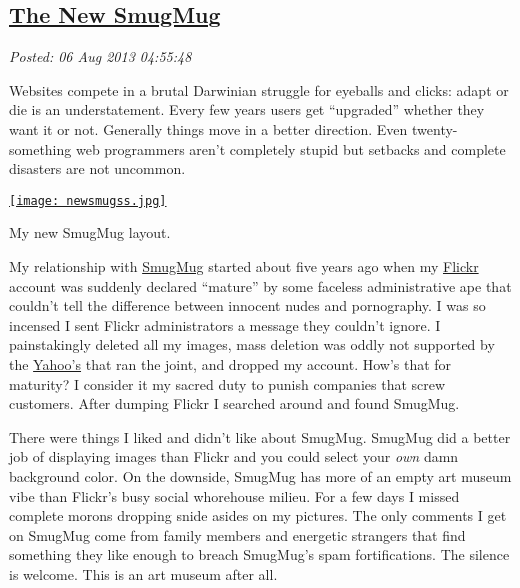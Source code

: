 %

\subsection*{\href{http://bakerjd99.wordpress.com/2013/08/05/the-new-smugmug/}{The New SmugMug}}


\noindent\emph{Posted: 06 Aug 2013 04:55:48}
\vspace{6pt}

Websites compete in a brutal Darwinian struggle for eyeballs and clicks:
adapt or die is an understatement. Every few years users get
``upgraded'' whether they want it or not. Generally things move in a
better direction. Even twenty-something web programmers aren't
completely stupid but setbacks and complete disasters are not uncommon.



\captionsetup[figure]{labelformat=empty}
\captionsetup[floatingfigure]{labelformat=empty}

\begin{floatingfigure}[r]{0.37\textwidth}
\centering
\href{http://conceptcontrol.smugmug.com/}{\texttt{[image: newsmugss.jpg]}}
\caption{My new SmugMug layout.}
\label{fig:4126X0}
\end{floatingfigure}


My relationship with \href{http://www.smugmug.com/}{SmugMug} started
about five years ago when my \href{http://www.flickr.com/}{Flickr}
account was suddenly declared ``mature'' by some faceless administrative
ape that couldn't tell the difference between innocent nudes and
pornography. I was so incensed I sent Flickr administrators a message
they couldn't ignore. I painstakingly deleted all my images, mass
deletion was oddly not supported by the
\href{http://www.yahoo.com/}{Yahoo's} that ran the joint, and dropped my
account. How's that for maturity? I consider it my sacred duty to punish
companies that screw customers. After dumping Flickr I searched around
and found SmugMug.

There were things I liked and didn't like about SmugMug. SmugMug did a
better job of displaying images than Flickr and you could select your
\emph{own} damn background color. On the downside, SmugMug has more of
an empty art museum vibe than Flickr's busy social whorehouse milieu.
For a few days I missed complete morons dropping snide asides on my
pictures. The only comments I get on SmugMug come from family members
and energetic strangers that find something they like enough to breach
SmugMug's spam fortifications. The silence is welcome. This is an art
museum after all.

